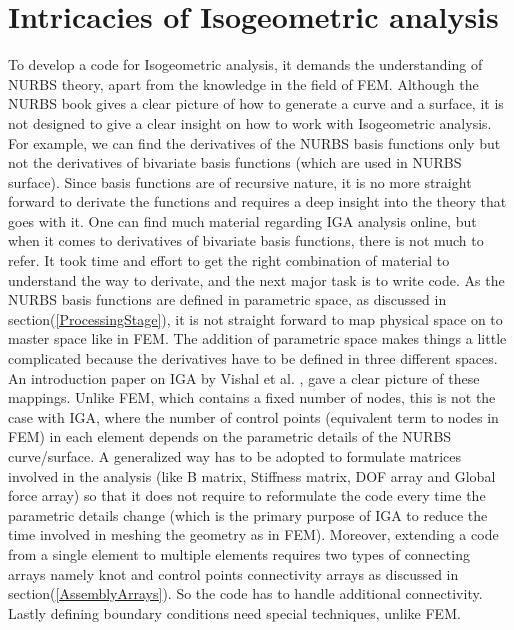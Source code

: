 \documentclass[11pt]{article}
\begin{document}
\section{Intricacies of Isogeometric analysis}
To develop a code for Isogeometric analysis, it demands the understanding of NURBS theory, apart from the knowledge in the field of FEM. Although the NURBS book gives a clear picture of how to generate a curve and a surface, it is not designed to give a clear insight on how to work with Isogeometric analysis. For example, we can find the derivatives of the NURBS basis functions only but not the derivatives of bivariate basis functions (which are used in NURBS surface). Since basis functions are of recursive nature, it is no more straight forward to derivate the functions and requires a deep insight into the theory that goes with it. One can find much material regarding IGA analysis online, but when it comes to derivatives of bivariate basis functions, there is not much to refer. It took time and effort to get the right combination of material to understand the way to derivate, and the next major task is to write code. As the NURBS basis functions are defined in parametric space, as discussed in section(\ref{ProcessingStage}), it is not straight forward to map physical space on to master space like in FEM. The addition of parametric space makes things a little complicated because the derivatives have to be defined in three different spaces. An introduction paper on IGA by Vishal et al. \cite{agrawal2019iga} , gave a clear picture of these mappings. Unlike FEM, which contains a fixed number of nodes, this is not the case with IGA, where the number of control points (equivalent term to nodes in FEM) in each element depends on the parametric details of the NURBS curve/surface. A generalized way has to be adopted to formulate matrices involved in the analysis (like B matrix, Stiffness matrix, DOF array and Global force array) so that it does not require to reformulate the code every time the parametric details change (which is the primary purpose of IGA to reduce the time involved in meshing the geometry as in FEM). Moreover, extending a code from a single element to multiple elements requires two types of connecting arrays namely knot and control points connectivity arrays as discussed in section(\ref{AssemblyArrays}). So the code has to handle additional connectivity. Lastly defining boundary conditions need special techniques, unlike FEM.

\newpage
\end{document}
